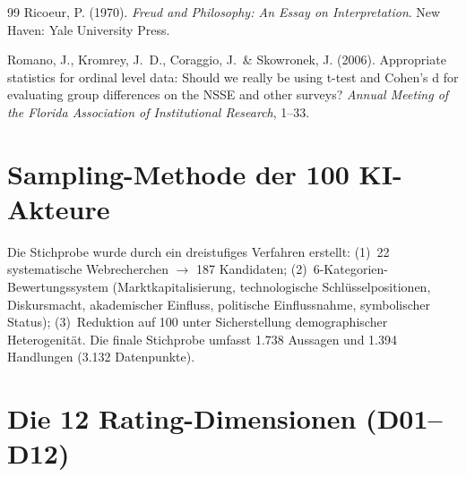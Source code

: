 \documentclass[12pt,a4paper]{article}
\begin{document}
\begin{thebibliography}{99}
  Ricoeur, P. (1970).
  \textit{Freud and Philosophy: An Essay on Interpretation}.
  New Haven: Yale University Press.

  Romano, J., Kromrey, J.~D., Coraggio, J.~\& Skowronek, J. (2006).
  Appropriate statistics for ordinal level data: Should we really be using t-test and Cohen's d for evaluating group differences on the NSSE and other surveys?
  \textit{Annual Meeting of the Florida Association of Institutional Research}, 1--33.

\end{thebibliography}


\newpage
\appendix

\section{Sampling-Methode der 100 KI-Akteure}
\label{app:sampling}

Die Stichprobe wurde durch ein dreistufiges Verfahren erstellt: (1)~22 systematische Webrecherchen $\to$ 187 Kandidaten; (2)~6-Kategorien-Bewertungssystem (Marktkapitalisierung, technologische Schlüsselpositionen, Diskursmacht, akademischer Einfluss, politische Einflussnahme, symbolischer Status); (3)~Reduktion auf 100 unter Sicherstellung demographischer Heterogenität. Die finale Stichprobe umfasst 1.738 Aussagen und 1.394 Handlungen (3.132 Datenpunkte).


\section{Die 12 Rating-Dimensionen (D01--D12)}
\label{app:dimensionen}
\end{document}
